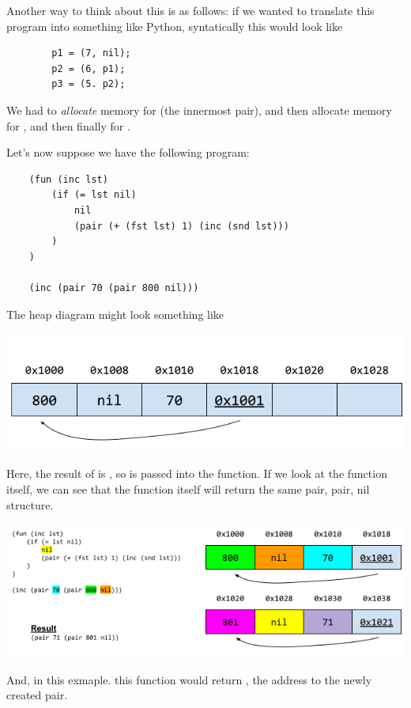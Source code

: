 \documentclass[letterpaper]{article}
\begin{document}
\begin{mdframed}
    Another way to think about this is as follows: if we wanted to translate this program into something like Python, syntatically this would look like 
    \begin{verbatim}
        p1 = (7, nil);
        p2 = (6, p1);
        p3 = (5. p2);\end{verbatim}
    We had to \emph{allocate} memory for  (the innermost pair), and then allocate memory for , and then finally for .
\end{mdframed}

Let's now suppose we have the following program:
\begin{verbatim}
    (fun (inc lst)
        (if (= lst nil)
            nil
            (pair (+ (fst lst) 1) (inc (snd lst)))
        )
    )

    (inc (pair 70 (pair 800 nil)))\end{verbatim}
The heap diagram might look something like 
\begin{center}
    \includegraphics[scale=0.6]{../assets/pair_heap2.png}
\end{center}
Here, the result of  is , so  is passed into the  function. If we look at the function itself, we can see that the function itself will return the same pair, pair, nil structure.
\begin{center}
    \includegraphics[scale=0.73]{../assets/pair_heap3.png}
\end{center}
And, in this exmaple. this function would return , the address to the newly created pair.
\end{document}
